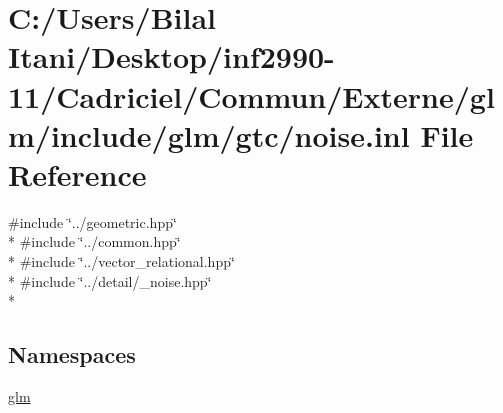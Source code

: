 \hypertarget{noise_8inl}{}\section{C\+:/\+Users/\+Bilal Itani/\+Desktop/inf2990-\/11/\+Cadriciel/\+Commun/\+Externe/glm/include/glm/gtc/noise.inl File Reference}
\label{noise_8inl}
{\ttfamily \#include \char`\"{}../geometric.\+hpp\char`\"{}}\\*
{\ttfamily \#include \char`\"{}../common.\+hpp\char`\"{}}\\*
{\ttfamily \#include \char`\"{}../vector\+\_\+relational.\+hpp\char`\"{}}\\*
{\ttfamily \#include \char`\"{}../detail/\+\_\+noise.\+hpp\char`\"{}}\\*
\subsection*{Namespaces}
\begin{DoxyCompactItemize}
\item 
 \hyperlink{namespaceglm}{glm}
\end{DoxyCompactItemize}
